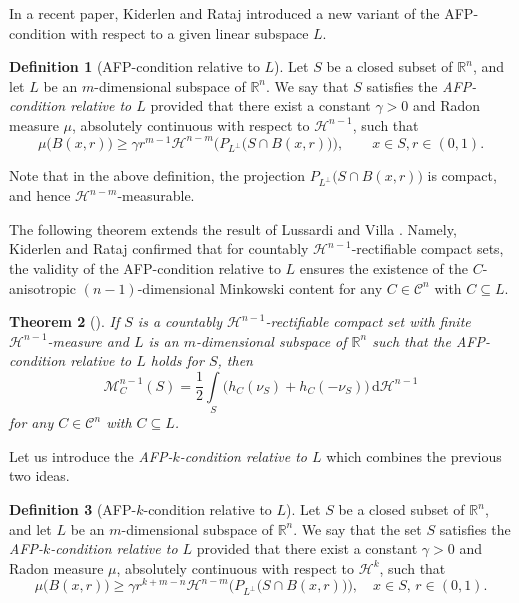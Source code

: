 \documentclass[pdflatex,sn-mathphys-num]{sn-jnl}
\theoremstyle{plain}
\newtheorem{theorem}{Theorem}[section]
\theoremstyle{definition}
\newtheorem{definition}[theorem]{Definition}
\newcommand{\dH}[1]{\,\mathrm d\mathcal{H}^{#1}}
\begin{document}
In a recent paper, Kiderlen and Rataj \cite{Rataj5} introduced a new variant of the AFP-condition with respect to a given linear subspace $L$.
\begin{definition}[AFP-condition relative to $L$]
    Let $S$ be a closed subset of $\mathbb{R}^n$, and let $L$ be an $m$-dimensional subspace of $\mathbb{R}^n$. We say that $S$ satisfies the \emph{AFP-condition relative to $L$} provided that there exist a constant $\gamma>0$ and Radon measure $\mu$, absolutely continuous with respect to $\mathcal{H}^{n-1}$, such that $$\mu\big(B(x, r)\big)\geq\gamma r^{m-1}\mathcal{H}^{n-m}\Big(P_{L^{\perp}}\big(S\cap B(x, r)\big)\Big),\qquad x\in S, r\in(0, 1).$$
\end{definition}
Note that in the above definition, the projection $P_{L^{\perp}}\big(S\cap B(x, r)\big)$ is compact, and hence $\mathcal{H}^{n-m}$-measurable.

\medskip

    The following theorem extends the result of Lussardi and Villa \cite[Theorem 3.4]{Villa2}. Namely, Kiderlen and Rataj confirmed that for countably $\mathcal{H}^{n-1}$-rectifiable compact sets, the validity of the AFP-condition relative to $L$ ensures the existence of the $C$-anisotropic $(n-1)$-dimensional Minkowski content for any $C\in\mathcal{C}^n$ with $C\subseteq L$.

\begin{theorem}[]
    If $S$ is a countably $\mathcal{H}^{n-1}$-rectifiable compact set with finite $\mathcal{H}^{n-1}$-measure and $L$ is an $m$-dimensional subspace of $\mathbb{R}^n$ such that the AFP-condition relative to $L$ holds for $S$, then $$\mathcal{M}^{n-1}_{C}(S)=\frac{1}{2}\int\limits_{S}\big(h_C(\nu_S)+h_C(-\nu_S)\big)\dH{n-1}$$ for any $C\in\mathcal{C}^n$ with $C\subseteq L$.
\end{theorem}
Let us introduce the \emph{AFP-$k$-condition relative to $L$} which combines the previous two ideas.

\begin{definition}[AFP-$k$-condition relative to $L$]
    Let $S$ be a closed subset of $\mathbb{R}^n$, and let $L$ be an $m$-dimensional subspace of $\mathbb{R}^n$. We say that the set $S$ satisfies the \emph{AFP-$k$-condition relative to $L$} provided that there exist a constant $\gamma>0$ and Radon measure $\mu$, absolutely continuous with respect to $\mathcal{H}^k$, such that $$\mu\big(B(x, r)\big)\geq\gamma r^{k+m-n}\mathcal{H}^{n-m}\Big(P_{L^{\perp}}\big(S\cap B(x, r)\big)\Big),\quad\text{$x\in S$, $r\in(0, 1)$.}$$
\end{definition}
\end{document}
